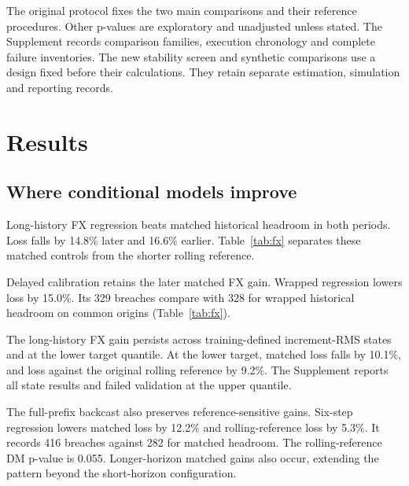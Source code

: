 \documentclass[11pt,a4paper]{article}
\begin{document}
The original protocol fixes the two main comparisons and their reference procedures. Other p-values are exploratory and unadjusted unless stated. The Supplement records comparison families, execution chronology and complete failure inventories. The new stability screen and synthetic comparisons use a design fixed before their calculations. They retain separate estimation, simulation and reporting records.

\FloatBarrier

\section{Results}\label{sec:results}

\subsection{Where conditional models improve}

Long-history FX regression beats matched historical headroom in both periods. Loss falls by 14.8\% later and 16.6\% earlier. Table~\ref{tab:fx} separates these matched controls from the shorter rolling reference.

Delayed calibration retains the later matched FX gain. Wrapped regression lowers loss by 15.0\%. Its 329 breaches compare with 328 for wrapped historical headroom on common origins (Table~\ref{tab:fx}).

The long-history FX gain persists across training-defined increment-RMS states and at the lower target quantile. At the lower target, matched loss falls by 10.1\%, and loss against the original rolling reference by 9.2\%. The Supplement reports all state results and failed validation at the upper quantile.

The full-prefix backcast also preserves reference-sensitive gains. Six-step regression lowers matched loss by 12.2\% and rolling-reference loss by 5.3\%. It records 416 breaches against 282 for matched headroom. The rolling-reference DM p-value is 0.055. Longer-horizon matched gains also occur, extending the pattern beyond the short-horizon configuration.
\end{document}
